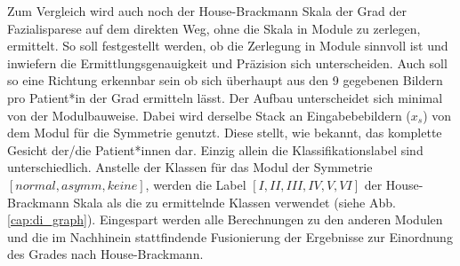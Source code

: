 Zum Vergleich wird auch noch der House-Brackmann Skala der Grad der Fazialisparese auf dem direkten Weg, ohne die Skala in Module zu zerlegen, ermittelt. So soll festgestellt werden, ob die Zerlegung in Module sinnvoll ist und inwiefern die Ermittlungsgenauigkeit und Präzision sich unterscheiden. Auch soll so eine Richtung erkennbar sein ob sich überhaupt aus den 9 gegebenen Bildern pro Patient*in der Grad ermitteln lässt. Der Aufbau unterscheidet sich minimal von der Modulbauweise. Dabei wird derselbe Stack an Eingabebebildern ($x_s$) von dem Modul für die Symmetrie genutzt. Diese stellt, wie bekannt, das komplette Gesicht der/die Patient*innen dar. Einzig allein die Klassifikationslabel sind unterschiedlich. Anstelle der Klassen für das Modul der Symmetrie $[normal, asymm, keine]$, werden die Label $[I, II, III, IV, V, VI]$ der House-Brackmann Skala als die zu ermittelnde Klassen verwendet (siehe Abb. \ref{cap:di_graph}). Eingespart werden alle Berechnungen zu den anderen Modulen und die im Nachhinein stattfindende Fusionierung der Ergebnisse zur Einordnung des Grades nach House-Brackmann.




